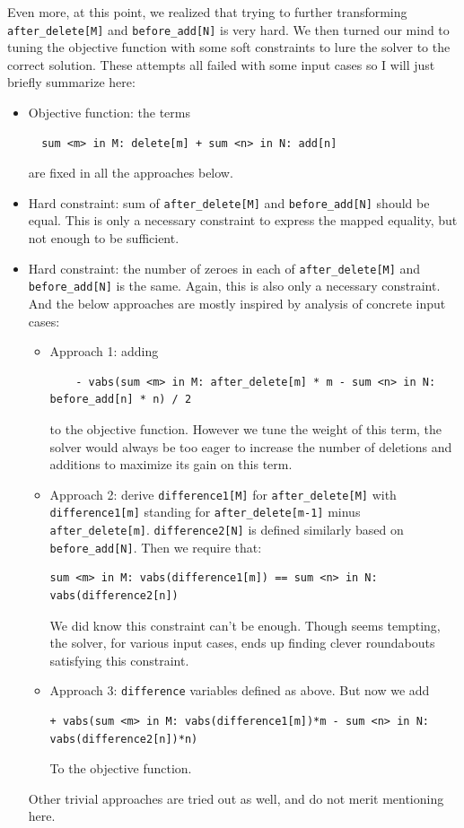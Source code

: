 \documentclass{article}
\begin{document}
Even more, at this point, we realized that trying to further transforming \texttt{after\_delete[M]} and \texttt{before\_add[N]} is very hard. We then turned our mind to tuning the objective function with some soft constraints to lure the solver to the correct solution. These attempts all failed with some input cases so I will just briefly summarize here:
\begin{itemize}
  \item Objective function: the terms
  \begin{lstlisting}
  sum <m> in M: delete[m] + sum <n> in N: add[n]
  \end{lstlisting}
   are fixed in all the approaches below. 
  \item Hard constraint: sum of \texttt{after\_delete[M]}  and \texttt{before\_add[N]} should be equal. This is only a necessary constraint to express the mapped equality, but not enough to be sufficient.
  \item Hard constraint: the number of zeroes in each of \texttt{after\_delete[M]} and \texttt{before\_add[N]} is the same. Again, this is also only a necessary constraint. \\

  And the below approaches are mostly inspired by analysis of concrete input cases:
  \begin{itemize}
    \item Approach 1: adding 
    \begin{lstlisting}
    - vabs(sum <m> in M: after_delete[m] * m - sum <n> in N: before_add[n] * n) / 2
    \end{lstlisting}
     to the objective function. However we tune the weight of this term, the solver would always be too eager to increase the number of deletions and additions to maximize its gain on this term.
    \item Approach 2: derive \texttt{difference1[M]} for \texttt{after\_delete[M]} with \texttt{difference1[m]} standing for \texttt{after\_delete[m-1]} minus \texttt{after\_delete[m]}. \texttt{difference2[N]} is defined similarly based on \texttt{before\_add[N]}. Then we require that:
    \begin{lstlisting}
sum <m> in M: vabs(difference1[m]) == sum <n> in N: vabs(difference2[n])
    \end{lstlisting}
    We did know this constraint can't be enough. Though seems tempting, the solver, for various input cases, ends up finding clever roundabouts satisfying this constraint. 
    \item Approach 3: \texttt{difference} variables defined as above. But now we add 
    \begin{lstlisting}
+ vabs(sum <m> in M: vabs(difference1[m])*m - sum <n> in N: vabs(difference2[n])*n)
    \end{lstlisting}
    To the objective function.
  \end{itemize}
  Other trivial approaches are tried out as well, and do not merit mentioning here. 
\end{itemize}
\end{document}
